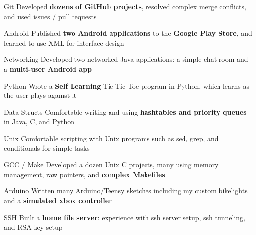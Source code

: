 




\begin{cvskills}

 \cvskill
    {Git} %
    {Developed \textbf{dozens of GitHub projects}, resolved complex merge conflicts, and used issues / pull requests} %

 \cvskill
    {Android} %
    {Published \textbf{two Android applications} to the \textbf{Google Play Store}, and learned to use XML for interface design} %

 \cvskill
    {Networking} %
    {Developed two networked Java applications: a simple chat room and a \textbf{multi-user Android app}} %
 
 \cvskill
    {Python} %
    {Wrote a \textbf{Self Learning} Tic-Tic-Toe program in Python, which learns as the user plays against it} %

 \cvskill
    {Data Structs} %
    {Comfortable writing and using \textbf{hashtables and priority queues} in Java, C, and Python} %

 \cvskill
    {Unix} %
    {Comfortable scripting with Unix programs such as sed, grep, and conditionals for simple tasks} %

 \cvskill
    {GCC / Make} %
    {Developed a dozen Unix C projects, many using memory management, raw pointers, and \textbf{complex Makefiles}} %

 \cvskill
    {Arduino} %
    {Written many Arduino/Teensy sketches including my custom bikelights and a \textbf{simulated xbox controller}} %

 \cvskill
    {SSH} %
    {Built a \textbf{home file server}: experience with ssh server setup, ssh tunneling, and RSA key setup} %


\end{cvskills}

